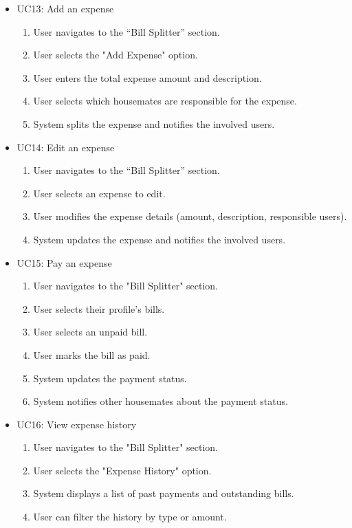 \documentclass{scrreprt}
\theoremstyle{definition}
\begin{document}
\begin{itemize}
    \item UC13: Add an expense
    \begin{enumerate}
        \item User navigates to the “Bill Splitter” section.
        \item User selects the "Add Expense" option.
        \item User enters the total expense amount and description.
        \item User selects which housemates are responsible for the expense.
        \item System splits the expense and notifies the involved users.
    \end{enumerate}
    
    \item UC14: Edit an expense
    \begin{enumerate}
        \item User navigates to the “Bill Splitter” section.
        \item User selects an expense to edit.
        \item User modifies the expense details (amount, description, responsible users).
        \item System updates the expense and notifies the involved users.
    \end{enumerate}
    
    \item UC15: Pay an expense
    \begin{enumerate}
        \item User navigates to the "Bill Splitter" section.
        \item User selects their profile's bills.
        \item User selects an unpaid bill.
        \item User marks the bill as paid.
        \item System updates the payment status.
        \item System notifies other housemates about the payment status.
    \end{enumerate}
    
    \item UC16: View expense history
    \begin{enumerate}
        \item User navigates to the "Bill Splitter" section.
        \item User selects the "Expense History" option.
        \item System displays a list of past payments and outstanding bills.
        \item User can filter the history by type or amount.
    \end{enumerate}
    

\end{itemize}
\end{document}
